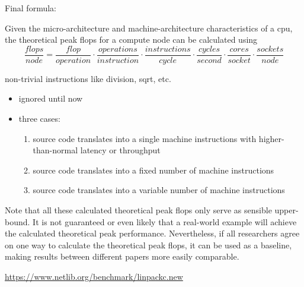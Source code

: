 Final formula: 

\begin{definition}
Given the micro-architecture and machine-architecture characteristics of a \gls{cpu}, the theoretical peak \acrfull{flops} for a compute node can be calculated using
$$ \frac{flops}{node} = \frac{flop}{operation} \cdot \frac{operations}{instruction} \cdot \frac{instructions}{cycle} \cdot \frac{cycles}{second} \cdot \frac{cores}{socket} \cdot \frac{sockets}{node} $$
\vspace{-1cm}
\end{definition}

non-trivial instructions like division, sqrt, etc.
\begin{itemize}
    \item ignored until now
    \item three cases:
    \begin{enumerate}
        \item source code translates into a single machine instructions with higher-than-normal latency or throughput
        \item source code translates into a fixed number of machine instructions
        \item source code translates into a variable number of machine instructions
    \end{enumerate}
\end{itemize}

Note that all these calculated theoretical peak \gls{flops} only serve as sensible upper-bound. 
It is not guaranteed or even likely that a real-world example will achieve the calculated theoretical peak performance. 
Nevertheless, if all researchers agree on one way to calculate the theoretical peak \gls{flops}, it can be used as a baseline, making results between different papers more easily comparable. 


\url{https://www.netlib.org/benchmark/linpackc.new}
